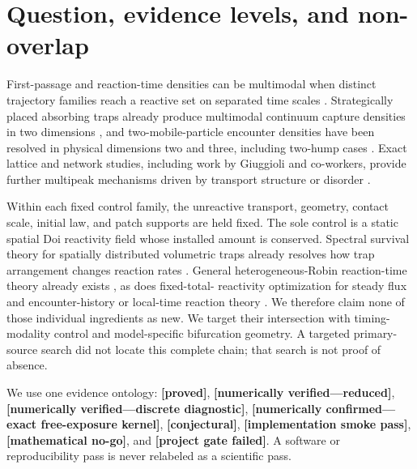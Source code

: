 \documentclass[aps,physrev,reprint,amsmath,amssymb,longbibliography,floatfix]{revtex4-2}
\newcommand{\status}[1]{\textbf{[#1]}}
\begin{document}
\maketitle

\section{Question, evidence levels, and non-overlap}\label{sec:intro}

First-passage and reaction-time densities can be multimodal when distinct
trajectory families reach a reactive set on separated time scales
\cite{godecMetzler2017twochannel,grebenkovMetzlerOshanin2018defocusing}.
Strategically placed absorbing traps already produce multimodal continuum
capture densities in two dimensions \cite{lindsaySpoonmoreTzou2016narrow},
and two-mobile-particle encounter densities have been resolved in physical
dimensions two and three, including two-hump cases
\cite{leVotEtAl2022encounter}.  Exact lattice and network studies, including
work by Giuggioli and co-workers, provide further multipeak mechanisms driven
by transport structure or disorder
\cite{giuggioliPerezBeckerSanders2013,giuggioli2020confined,
giuggioliEtAl2024multitarget,marrisEtAl2025disordered}.

Within each fixed control family, the unreactive transport, geometry, contact
scale, initial law, and patch supports are held fixed.  The sole control is a
static spatial Doi reactivity field whose installed amount is conserved.
Spectral survival theory for spatially
distributed volumetric traps already resolves how trap arrangement changes
reaction rates \cite{nguyenGrebenkov2010porous}.  General heterogeneous-Robin reaction-time
theory already exists \cite{grebenkov2019heterogeneous}, as does fixed-total-
reactivity optimization for steady flux \cite{nicolaouMulder2023flux} and
encounter-history or local-time reaction theory
\cite{grebenkov2007residence,grebenkov2020multiple,
grebenkov2020paradigm}.  We therefore claim none of those individual
ingredients as new.  We target their intersection with timing-modality
control and model-specific bifurcation geometry.  A targeted primary-source
search did not locate this complete chain; that search is not proof of
absence.

We use one evidence ontology:
\status{proved}, \status{numerically verified---reduced},
\status{numerically verified---discrete diagnostic},
\status{numerically confirmed---exact free-exposure kernel}, \status{conjectural},
\status{implementation smoke pass}, \status{mathematical no-go}, and
\status{project gate failed}.
A software or reproducibility pass is never relabeled as a scientific pass.
\end{document}
